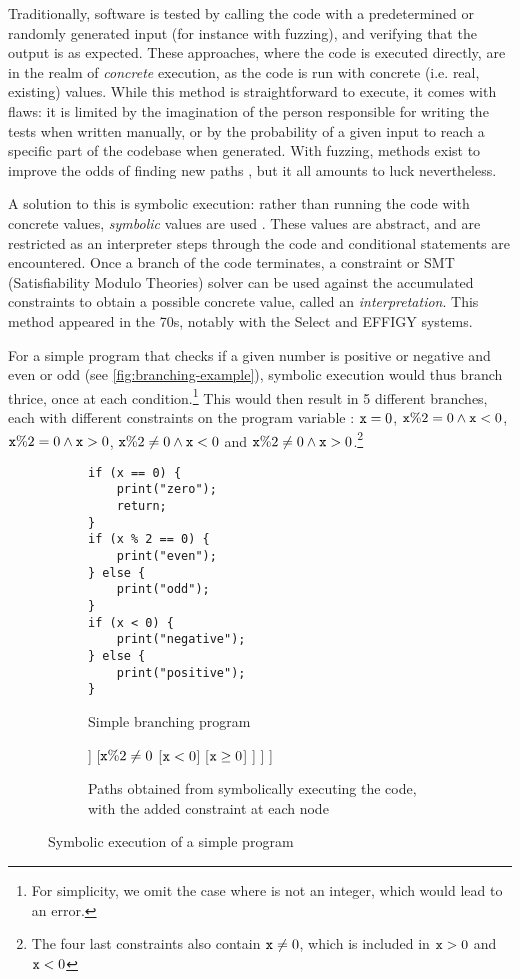Traditionally, software is tested by calling the code with a predetermined or randomly generated input (for instance with fuzzing), and verifying that the output is as expected. These approaches, where the code is executed directly, are in the realm of \emph{concrete} execution, as the code is run with concrete (i.e. real, existing) values. While this method is straightforward to execute, it comes with flaws: it is limited by the imagination of the person responsible for writing the tests when written manually, or by the probability of a given input to reach a specific part of the codebase when generated. With fuzzing, methods exist to improve the odds of finding new paths \cite{smartfuzzing}, but it all amounts to luck nevertheless.

A solution to this is symbolic execution: rather than running the code with concrete values, \emph{symbolic} values are used \cite{surveysymex}. These values are abstract, and are restricted as an interpreter steps through the code and conditional statements are encountered. Once a branch of the code terminates, a constraint or SMT (Satisfiability Modulo Theories) solver can be used against the accumulated constraints to obtain a possible concrete value, called an \emph{interpretation}. This method appeared in the 70s, notably with the Select \cite{select-system} and EFFIGY \cite{effigy-system} systems.

For a simple program that checks if a given number is positive or negative and even or odd (see \autoref{fig:branching-example}), symbolic execution would thus branch thrice, once at each condition.\footnote{For simplicity, we omit the case where  is not an integer, which would lead to an error.} This would then result in 5 different branches, each with different constraints on the program variable : $\code{x} = 0$, $\texttt{x}\%2=0 \land \texttt{x}<0$, $\texttt{x}\%2=0 \land \texttt{x}>0$, $\texttt{x}\%2\neq0 \land \texttt{x}<0$ and $\texttt{x}\%2\neq0 \land \texttt{x}>0$.\footnote{The four last constraints also contain $\code{x} \neq 0$, which is included in $\texttt{x}>0$ and $\code{x}<0$}

\begin{figure}[h]
\centering
\begin{subfigure}{.5\textwidth}
	\centering
	\begin{lstlisting}
if (x == 0) {
	print("zero");
	return;
}
if (x % 2 == 0) {
	print("even");
} else {
	print("odd");
}
if (x < 0) {
	print("negative");
} else {
	print("positive");
}
	\end{lstlisting}
	\caption{Simple branching program}
\end{subfigure}%
\begin{subfigure}{.5\textwidth}
\centering
\begin{forest}
[{$\top$}
	[{$\code{x} = 0$}]
	[{$\code{x}\neq 0$}
		[{$\code{x}\%2=0$}
			[{$\code{x} < 0$}]
			[{$\code{x} \geq 0$}]
		]
		[{$\texttt{x}\%2\neq0$}
			[{$\code{x} < 0$}]
			[{$\code{x} \geq 0$}]
		]
	]
]
\end{forest}
\caption{Paths obtained from symbolically executing the code, with the added constraint at each node}
\end{subfigure}
\caption{Symbolic execution of a simple program}
	\label{fig:branching-example}
\end{figure}
